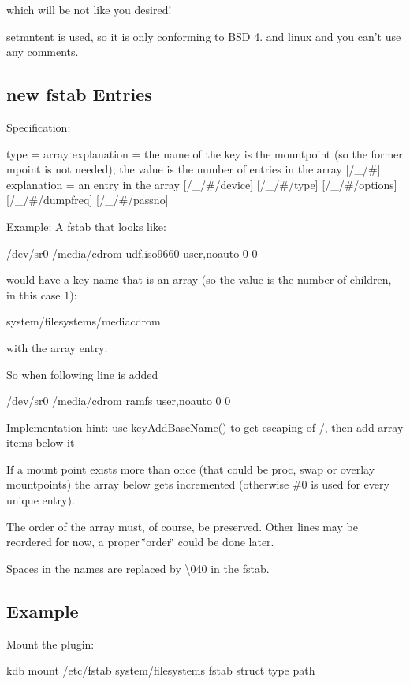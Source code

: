 which will be not like you desired!

setmntent is used, so it is only conforming to B\+S\+D 4. and linux and you can't use any comments.

\subsection*{new fstab Entries}

Specification\+: \begin{DoxyVerb}[/_]
type = array
explanation = the name of the key is the mountpoint (so the former
  mpoint is not needed); the value is the number of entries in the
  array
[/_/#]
explanation = an entry in the array
[/_/#/device]
[/_/#/type]
[/_/#/options]
[/_/#/dumpfreq]
[/_/#/passno]
\end{DoxyVerb}


Example\+: A fstab that looks like\+: \begin{DoxyVerb}/dev/sr0        /media/cdrom   udf,iso9660 user,noauto     0       0
\end{DoxyVerb}


would have a key name that is an array (so the value is the number of children, in this case 1)\+: \begin{DoxyVerb}system/filesystems/\/media\/cdrom
\end{DoxyVerb}


with the array entry\+: 


So when following line is added \begin{DoxyVerb}/dev/sr0        /media/cdrom   ramfs user,noauto     0       0
\end{DoxyVerb}


Implementation hint\+: use \hyperlink{group__keyname_gaa942091fc4bd5c2699e49ddc50829524}{key\+Add\+Base\+Name()} to get escaping of /, then add array items below it

If a mount point exists more than once (that could be proc, swap or overlay mountpoints) the array below gets incremented (otherwise \#0 is used for every unique entry).

The order of the array must, of course, be preserved. Other lines may be reordered for now, a proper \char`\"{}order\char`\"{} could be done later.

Spaces in the names are replaced by \textbackslash{}040 in the fstab.

\subsection*{Example}

Mount the plugin\+: \begin{DoxyVerb}    kdb mount /etc/fstab system/filesystems fstab struct type path\end{DoxyVerb}
 